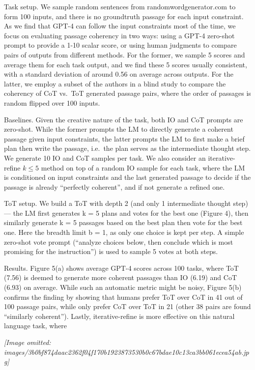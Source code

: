 \documentclass[
]{article}
\begin{document}
Task setup. We sample random sentences from randomwordgenerator.com to
form 100 inputs, and there is no groundtruth passage for each input
constraint. As we find that GPT-4 can follow the input constraints most
of the time, we focus on evaluating passage coherency in two ways: using
a GPT-4 zero-shot prompt to provide a 1-10 scalar score, or using human
judgments to compare pairs of outputs from different methods. For the
former, we sample 5 scores and average them for each task output, and we
find these 5 scores usually consistent, with a standard deviation of
around 0.56 on average across outputs. For the latter, we employ a
subset of the authors in a blind study to compare the coherency of CoT
vs.~ToT generated passage pairs, where the order of passages is random
flipped over 100 inputs.

Baselines. Given the creative nature of the task, both IO and CoT
prompts are zero-shot. While the former prompts the LM to directly
generate a coherent passage given input constraints, the latter prompts
the LM to first make a brief plan then write the passage, i.e.~the plan
serves as the intermediate thought step. We generate 10 IO and CoT
samples per task. We also consider an iterative-refine \(k \leq 5\)
method on top of a random IO sample for each task, where the LM is
conditioned on input constraints and the last generated passage to
decide if the passage is already ``perfectly coherent'', and if not
generate a refined one.

ToT setup. We build a ToT with depth 2 (and only 1 intermediate thought
step) --- the LM first generates k = 5 plans and votes for the best one
(Figure 4), then similarly generate k = 5 passages based on the best
plan then vote for the best one. Here the breadth limit b = 1, as only
one choice is kept per step. A simple zero-shot vote prompt (``analyze
choices below, then conclude which is most promising for the
instruction'') is used to sample 5 votes at both steps.

Results. Figure 5(a) shows average GPT-4 scores across 100 tasks, where
ToT (7.56) is deemed to generate more coherent passages than IO (6.19)
and CoT (6.93) on average. While such an automatic metric might be
noisy, Figure 5(b) confirms the finding by showing that humans prefer
ToT over CoT in 41 out of 100 passage pairs, while only prefer CoT over
ToT in 21 (other 38 pairs are found ``similarly coherent''). Lastly,
iterative-refine is more effective on this natural language task, where

\textit{[Image omitted: images/3b0bf874daac2362f04f170b1923873530b0c67bdae10c13ca3bb061ecea54ab.jpg]}
\end{document}
